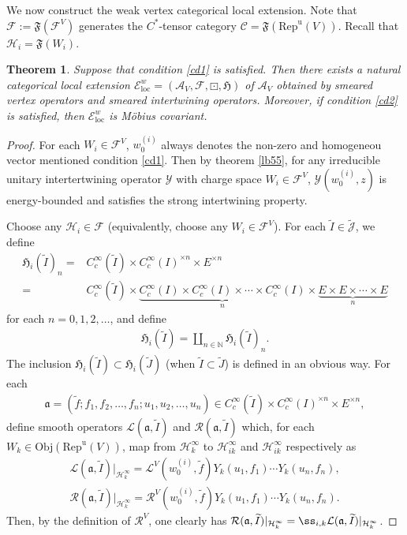 \documentclass[12pt,a4paper]{article}
\theoremstyle{definition}
\theoremstyle{plain}
\newtheorem{thm}[df]{Theorem}
\newcommand{\fk}{\mathfrak}
\newcommand{\mc}{\mathcal}
\newcommand{\wtd}{\widetilde}
\newcommand{\loc}{\mathrm{loc}}
\newcommand{\scr}{\mathscr}
\newcommand{\Jtd}{\widetilde{\mathcal J}}
\newcommand{\RepuV}{\mathrm{Rep}^{\mathrm u}(V)}
\newcommand{\mbb}{\mathbb}
\newcommand{\Obj}{\mathrm{Obj}}
\numberwithin{equation}{subsection}
\begin{document}
We now construct the weak vertex categorical local extension. Note that $\mc F:=\fk F(\mc F^V)$ generates the $C^*$-tensor category $\scr C=\fk F(\RepuV)$. Recall that $\mc H_i=\fk F(W_i)$.

\begin{thm}
Suppose that condition \ref{cd1} is satisfied. Then there exists a natural categorical local extension $\scr E^w_\loc=(\mc A_V,\mc F,\boxdot,\fk H)$ of $\mc A_V$ obtained by smeared vertex operators and smeared intertwining operators. Moreover, if condition \ref{cd2} is satisfied, then $\scr E^w_\loc$ is M\"obius covariant.
\end{thm}


\begin{proof}
For each $W_i\in\mc F^V$, $w^{(i)}_0$ always denotes the non-zero and homogeneou vector mentioned condition \ref{cd1}. Then by theorem \ref{lb55}, for any irreducible unitary intertertwining operator $\mc Y$ with charge space $W_i\in\mc F^V$, $\mc Y(w^{(i)}_0,z)$ is energy-bounded and satisfies the strong intertwining property. 

Choose any $\mc H_i\in\mc F$ (equivalently, choose any $W_i\in\mc F^V$). For each $\wtd I\in\Jtd$, we define
\begin{align}
\fk H_i(\wtd I)_n=&C_c^\infty(\wtd I)\times C_c^\infty(I)^{\times n}\times E^{\times n}\nonumber\\
=&C_c^\infty(\wtd I)\times\underbrace{C_c^\infty(I)\times C_c^\infty(I)\times\cdots\times C_c^\infty(I)}_{n}\times\underbrace{E\times E\times\cdots\times E}_{n} 
\end{align}
for each $n=0,1,2,\dots$, and define 
\begin{align}
\fk H_i(\wtd I)=\coprod_{n\in\mbb N}\fk H_i(\wtd I)_n.
\end{align}
The inclusion $\fk H_i(\wtd I)\subset \fk H_i(\wtd J)$ (when $\wtd I\subset\wtd J$) is defined in an obvious way. For each
\begin{align*}
\fk a=(\wtd f;f_1,f_2,\dots,f_n;u_1,u_2,\dots,u_n)\in C_c^\infty(\wtd I)\times C_c^\infty(I)^{\times n}\times E ^{\times n},
\end{align*}
define smooth operators $\mc L(\fk a,\wtd I)$ and $\mc R(\fk a,\wtd I)$ which, for each $W_k\in\Obj(\RepuV)$, map from $\mc H_k^\infty$ to $\mc H_{ik}^\infty$ and $\mc H_{ik}^\infty$ respectively as
\begin{gather}
\mc L(\fk a,\wtd I)|_{\mc H_k^\infty}=\mc L^V(w^{(i)}_0,\wtd f)Y_k(u_1,f_1)\cdots Y_k(u_n,f_n),\label{eq40}\\
\mc R(\fk a,\wtd I)|_{\mc H_k^\infty}=\mc R^V(w^{(i)}_0,\wtd f)Y_k(u_1, f_1)\cdots Y_k(u_n,f_n).\label{eq41}
\end{gather}
Then, by the definition of $\mc R^V$, one clearly has $\mc R(\fk a,\wtd I)|_{\mc H_k^\infty}=\ss_{i,k}\mc L(\fk a,\wtd I)|_{\mc H_k^\infty}$. 


\end{proof}
\end{document}
